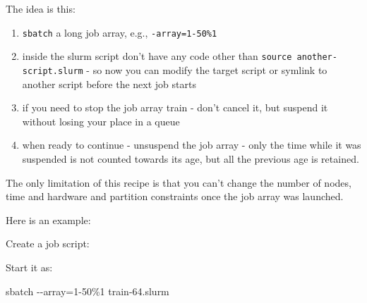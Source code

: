 \documentclass[
]{report}
\newenvironment{Shaded}{\begin{snugshade}}{\end{snugshade}}
\newcommand{\AttributeTok}[1]{\textcolor[rgb]{0.40,0.45,0.13}{#1}}
\newcommand{\BuiltInTok}[1]{\textcolor[rgb]{0.00,0.23,0.31}{#1}}
\newcommand{\CommentTok}[1]{\textcolor[rgb]{0.37,0.37,0.37}{#1}}
\newcommand{\ExtensionTok}[1]{\textcolor[rgb]{0.00,0.23,0.31}{#1}}
\newcommand{\NormalTok}[1]{\textcolor[rgb]{0.00,0.23,0.31}{#1}}
\newcommand{\OperatorTok}[1]{\textcolor[rgb]{0.37,0.37,0.37}{#1}}
\providecommand{\tightlist}{%
  \setlength{\itemsep}{0pt}\setlength{\parskip}{0pt}}\usepackage{longtable,booktabs,array}
\begin{document}
The idea is this:

\begin{enumerate}
\def\labelenumi{\arabic{enumi}.}
\tightlist
\item
  \texttt{sbatch} a long job array, e.g., \texttt{-array=1-50\%1}
\item
  inside the slurm script don't have any code other than
  \texttt{source\ another-script.slurm} - so now you can modify the
  target script or symlink to another script before the next job starts
\item
  if you need to stop the job array train - don't cancel it, but suspend
  it without losing your place in a queue
\item
  when ready to continue - unsuspend the job array - only the time while
  it was suspended is not counted towards its age, but all the previous
  age is retained.
\end{enumerate}

The only limitation of this recipe is that you can't change the number
of nodes, time and hardware and partition constraints once the job array
was launched.

Here is an example:

Create a job script:

\begin{Shaded}
\end{Shaded}

Start it as:

\begin{Shaded}
\begin{Highlighting}[]
\ExtensionTok{sbatch} \AttributeTok{{-}{-}array}\OperatorTok{=}\NormalTok{1{-}50\%1 train{-}64.slurm}
\end{Highlighting}
\end{Shaded}
\end{document}
